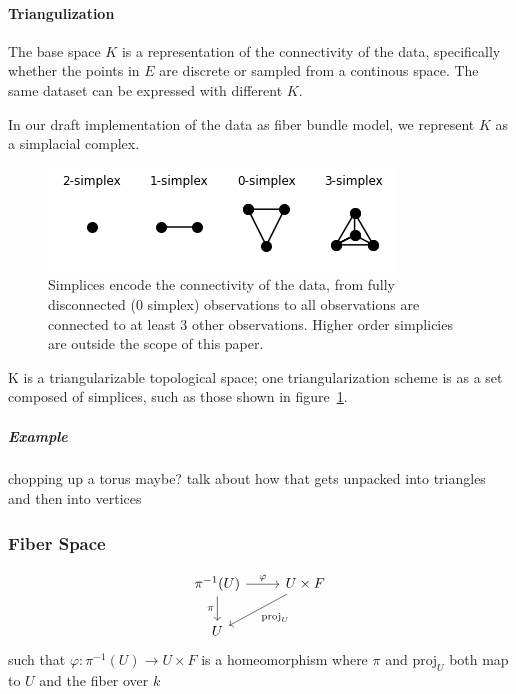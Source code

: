 \documentclass[../main.tex]{subfiles}
\begin{document}
\paragraph{Triangulization}
\label{sec:triangulization}

The base space $K$ is a representation of the connectivity of the data, specifically whether the points in $E$ are discrete or sampled from a continous space. The same dataset can be expressed with different $K$. 

In our draft implementation of the data as fiber bundle model, we represent $K$ as a simplacial complex. 

\begin{figure}[H]
    \label{fig:simplex}
    \includegraphics{figures/sections/math/simplex.png}
    \caption{Simplices encode the connectivity of the data, from fully disconnected (0 simplex) observations to all observations are connected to at least 3 other observations. Higher order simplicies are outside the scope of this paper.}
\end{figure}

K is a triangularizable topological space; one triangularization scheme is as a set composed of simplices, such as those shown in figure~\ref{fig:simplex}. 


\subparagraph{Example}
chopping up a torus maybe? talk about how that gets unpacked into triangles and then into vertices


\subsubsection{Fiber Space}
\label{sec:fiber_data}



\begin{equation}
    \label{eq:fiber_local_trivial}
    \begin{tikzcd}
        \pi^{-1}(U) \arrow[r, "\varphi"] \arrow[d, "\pi"'] & U \times F \arrow[ld, "\mathrm{proj}_U"] \\
        U                                                  &                                         
    \end{tikzcd}
\end{equation}
such that $\varphi: \pi^{-1}(U) \rightarrow U \times F$ is a homeomorphism where $\pi$ and $\mathrm{proj}_U$ both map to $U$ and the fiber over $k$
\end{document}
